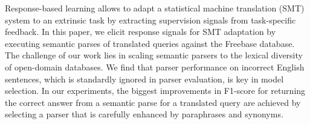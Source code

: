Response-based learning allows to adapt a statistical machine translation (SMT) system to an extrinsic task by extracting supervision signals from task-specific feedback. In this paper, we elicit response signals for SMT adaptation by executing semantic parses of translated queries against the Freebase database. The challenge of our work lies in scaling semantic parsers to the lexical diversity of open-domain databases. We find that parser performance on incorrect English sentences, which is standardly ignored in parser evaluation, is key in model selection. In our experiments, the biggest improvements in F1-score for returning the correct answer from a semantic parse for a translated query are achieved by selecting a parser that is carefully enhanced by paraphrases and synonyms.
